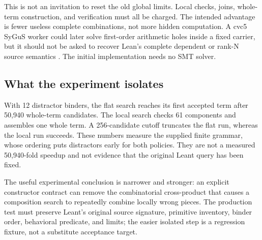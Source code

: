 This is not an invitation to reset the old global limits. Local checks, joins,
whole-term construction, and verification must all be charged. The intended
advantage is fewer useless complete combinations, not more hidden computation.
A cvc5 SyGuS worker could later solve first-order arithmetic holes inside a
fixed carrier, but it should not be asked to recover Lean's complete dependent
or rank-N source semantics \cite{cvc5}. The initial implementation needs no SMT
solver.

\subsection{What the experiment isolates}

With 12 distractor binders, the flat search reaches its first accepted term after
50,940 whole-term candidates. The local search checks 61 components and assembles
one whole term. A 256-candidate cutoff truncates the flat run, whereas the local
run succeeds. These numbers measure the supplied finite grammar, whose ordering
puts distractors early for both policies. They are not a measured 50,940-fold
speedup and not evidence that the original Leant query has been fixed.

The useful experimental conclusion is narrower and stronger: an explicit
constructor contract can remove the combinatorial cross-product that causes a
composition search to repeatedly combine locally wrong pieces. The production
test must preserve Leant's original source signature, primitive inventory,
binder order, behavioral predicate, and limits; the easier isolated step is a
regression fixture, not a substitute acceptance target.
